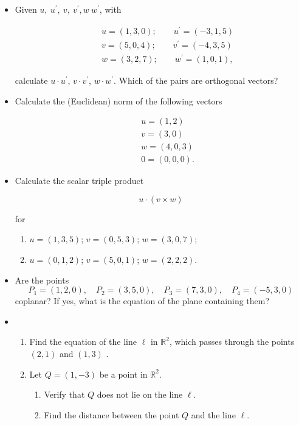 \documentclass[12pt,a4paper]{article}
\begin{document}
\begin{itemize}
\item Given
$u,\:u^{\prime},\:v,\:v^{\prime},w\:w^{\prime}$, with

\begin{eqnarray*}
& & u=(1,3,0);\qquad u^{\prime}=(-3,1,5)\\
& & v=(5,0,4);\qquad v^{\prime}=(-4,3,5)\\
& & w=(3,2,7);\qquad w^{\prime}=(1,0,1),
\end{eqnarray*}

calculate $u\cdot u^{\prime}$, $v\cdot v^{\prime}$, $w\cdot
w^{\prime}$. Which of the pairs are orthogonal vectors?

\vspace{0.25cm}\item Calculate the (Euclidean) norm of the
following vectors

\begin{eqnarray*}
& & u=(1,2)\\
& & v=(3,0)\\
& & w=(4,0,3)\\
& & 0=(0,0,0).
\end{eqnarray*}
\item Calculate the scalar triple product

\[u\cdot (v\times w)\]

for

\begin{enumerate}
\item $u=(1,3,5)$; $v=(0,5,3)$; $w=(3,0,7)$;

\item $u=(0,1,2)$; $v=(5,0,1)$; $w=(2,2,2).$
\end{enumerate}
\vfill\item Are the points 
$$P_1=(1,2,0), \quad P_2=(3,5,0),\quad P_3=(7,3,0), \quad P_4=(-5,3,0)
$$
coplanar? If yes, what is the equation of the plane containing them?

\vfill\item
\begin{enumerate}
\item Find the equation of the line $\ell$ in $\mathbb{R}^2$, which  passes through the 
points $(2,1)$ and $(1,3)$ .

\item  Let $Q = (1, -3)$  be a point in $\mathbb{R}^2$.
\begin{enumerate}
\item Verify that $Q$ does not lie on the line $\ell$.

\item Find the distance between the point $Q$ and the line $\ell$.
\end{enumerate}
\end{enumerate}\newpage
\vspace{0.25cm}

\end{itemize}
\end{document}
